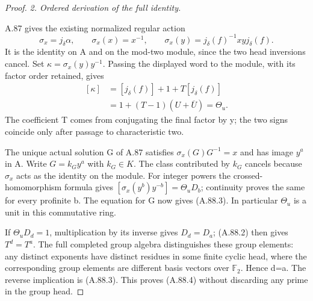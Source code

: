 \begin{proof}
\emph{2. Ordered derivation of the full identity.}\par
A.87 gives the existing normalized regular action
\[
 \sigma_x=j_\delta\alpha,\qquad
 \sigma_x(x)=x^{-1},\qquad
 \sigma_x(y)=j_\delta(f)^{-1}xyj_\delta(f).
\]
It is the identity on A and on the mod-two module, since the two
head inversions cancel. Set \(\kappa=\sigma_x(y)y^{-1}\). Passing
the displayed word to the module, with its factor order retained,
gives
\[
 \begin{aligned}
 [\kappa]
   &=[j_\delta(f)]+1+T[j_\delta(f)]\\
   &=1+(T-1)(U+\overline U)=\Theta_u.
 \end{aligned}
 \tag{A.88.9}
\]
The coefficient T comes from conjugating the final factor by y;
the two signs coincide only after passage to characteristic two.

The unique actual solution G of A.87 satisfies
\(\sigma_x(G)G^{-1}=x\) and has image \(y^a\) in A. Write
\(G=k_Gy^a\) with \(k_G\in K\). The class contributed by \(k_G\)
cancels because \(\sigma_x\) acts as the identity on the module.
For integer powers the crossed-homomorphism formula gives
\([\sigma_x(y^b)y^{-b}]=\Theta_uD_b\); continuity proves the same
for every profinite b. The equation for G now gives (A.88.3).
In particular \(\Theta_u\) is a unit in this commutative ring.

If \(\Theta_uD_d=1\), multiplication by its inverse gives
\(D_d=D_a\); (A.88.2) then gives \(T^d=T^a\). The full completed
group algebra distinguishes these group elements: any distinct
exponents have distinct residues in some finite cyclic head, where
the corresponding group elements are different basis vectors over
\(\mathbb F_2\). Hence d=a. The reverse implication is (A.88.3).
This proves (A.88.4) without discarding any prime in the group head.


\end{proof}
